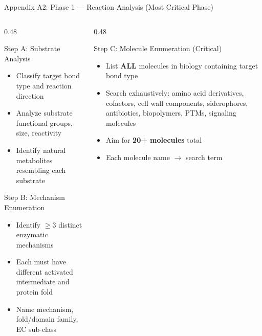 \documentclass[aspectratio=169, 11pt]{beamer}
\begin{document}
\begin{frame}{Appendix A2: Phase 1 --- Reaction Analysis (Most Critical Phase)}
\vspace{-4pt}
\begin{columns}[T]
\begin{column}{0.48\textwidth}
\begin{block}{\small Step A: Substrate Analysis}
\vspace{-2pt}
\begin{itemize}\scriptsize
\setlength\itemsep{0pt}
\item Classify target bond type and reaction direction
\item Analyze substrate functional groups, size, reactivity
\item Identify natural metabolites resembling each substrate
\end{itemize}
\end{block}

\begin{block}{\small Step B: Mechanism Enumeration}
\vspace{-2pt}
\begin{itemize}\scriptsize
\setlength\itemsep{0pt}
\item Identify $\geq$3 distinct enzymatic mechanisms
\item Each must have different activated intermediate and protein fold
\item Name mechanism, fold/domain family, EC sub-class
\end{itemize}
\end{block}
\end{column}
\begin{column}{0.48\textwidth}
\begin{alertblock}{\small Step C: Molecule Enumeration (Critical)}
\vspace{-2pt}
\begin{itemize}\scriptsize
\setlength\itemsep{0pt}
\item List \textbf{ALL} molecules in biology containing target bond type
\item Search exhaustively: amino acid derivatives, cofactors, cell wall components, siderophores, antibiotics, biopolymers, PTMs, signaling molecules
\item Aim for \textbf{20+ molecules} total
\item Each molecule name $\rightarrow$ search term
\end{itemize}
\end{alertblock}


\end{column}
\end{columns}
\end{frame}
\end{document}
